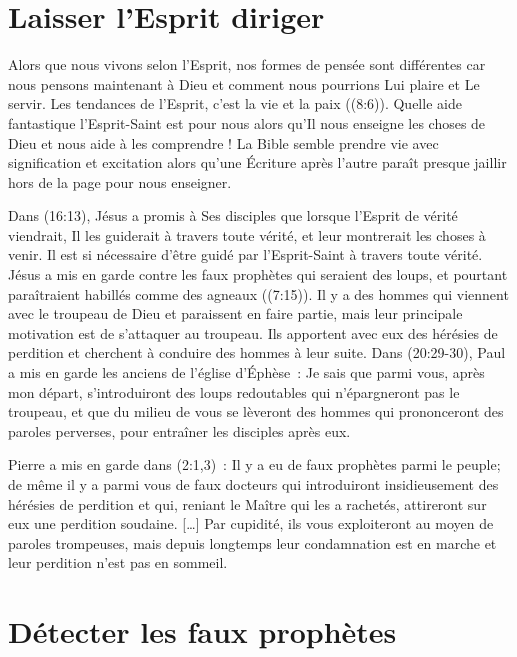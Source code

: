 \section*{Laisser l'Esprit diriger}

Alors que nous vivons selon l'Esprit, nos formes de pensée sont différentes
 car nous pensons maintenant à Dieu et comment nous pourrions
 Lui plaire et Le servir.
 Les tendances de l'Esprit, c'est la vie et la paix ((8:6)).
 Quelle aide fantastique l'Esprit-Saint est pour nous alors qu'Il nous enseigne
 les choses de Dieu et nous aide à les comprendre !
 La Bible semble prendre vie avec signification et excitation
 alors qu'une Écriture après l'autre paraît presque jaillir
 hors de la page pour nous enseigner.

\begin{specialpar}{}
Dans (16:13), Jésus a promis à Ses disciples
 que lorsque l'Esprit de vérité viendrait,
 Il les guiderait à travers toute vérité,
 et leur montrerait les choses à venir.
 Il est si nécessaire d'être guidé par l'Esprit-Saint
 à travers toute vérité.
 Jésus a mis en garde contre les faux prophètes qui seraient des loups,
 et pourtant paraîtraient habillés comme des agneaux ((7:15)).
 Il y a des hommes qui viennent avec le troupeau de Dieu
 et paraissent en faire partie, mais leur principale motivation
 est de s'attaquer au troupeau.
 Ils apportent avec eux des hérésies de perdition
 et cherchent à conduire des hommes à leur suite.
 Dans (20:29-30),
 Paul a mis en garde les anciens de l'église d'Éphèse~:
 \og Je sais que parmi vous, après mon départ,
 s'introduiront des loups redoutables
 qui n'épargneront pas le troupeau,
 et que du milieu de vous se lèveront des hommes
 qui prononceront des paroles perverses,
 pour entraîner les disciples après eux. \fg{}
\end{specialpar}

Pierre a mis en garde dans (2:1,3)~:
 \og Il y a eu de faux prophètes parmi le peuple;
 de même il y a parmi vous de faux docteurs
 qui introduiront insidieusement des hérésies de perdition et qui,
 reniant le Maître qui les a rachetés,
 attireront sur eux une perdition soudaine. [\dots{}]
 Par cupidité, ils vous exploiteront au moyen de paroles trompeuses,
 mais depuis longtemps leur condamnation est en marche
 et leur perdition n'est pas en sommeil. \fg{}


\section*{Détecter les faux prophètes}

